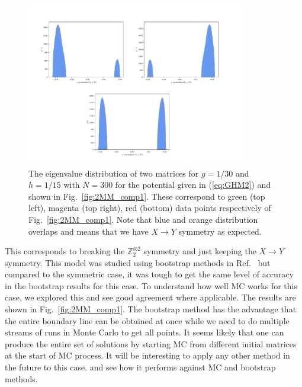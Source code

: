 \documentclass[letter,11pt]{article}
\begin{document}
\begin{figure}[htbp] 
	\centering 
	\includegraphics[width=0.85\textwidth]{figs/all_symb_ev.pdf}
	\caption{\label{fig:2MM_evd}The eigenvalue distribution of two matrices for $g=1/30$ and $h=1/15$ 
	with $N=300$ for the potential given in (\ref{eq:GHM2}) and shown in Fig.~\ref{fig:2MM_comp1}.
	These correspond to green (top left), magenta (top right), red (bottom) data points respectively of Fig.~\ref{fig:2MM_comp1}. Note that blue and orange distribution overlaps and means that we have $X \to Y$ symmetry as expected.}
\end{figure}
This corresponds to breaking the $\mathbb{Z}_{2}^{\otimes 2}$ symmetry and just keeping the $X \to Y$ symmetry. This model was studied using bootstrap methods in 
Ref.~\cite{Kazakov:2021lel} but compared to the symmetric case, it was tough to get the same level of accuracy in the bootstrap results for this case. To understand how well MC works for this case, we explored this and see good agreement where applicable. The results are shown in Fig.~\ref{fig:2MM_comp1}. The bootstrap method has the advantage that the entire boundary line can be obtained at once while we need to do multiple streams of runs in Monte Carlo to get all points. It seems likely that one can produce the entire set of solutions by starting MC from different initial matrices at the start of MC process.  It will be interesting to apply any other method in the future to this case.
and see how it performs against MC and bootstrap methods.  
\end{document}

